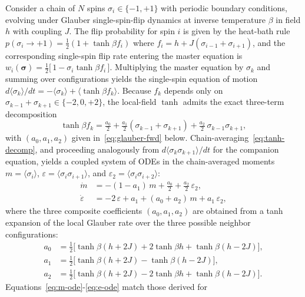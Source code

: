 \documentclass[conference]{IEEEtran}
\newcommand{\eps}{\varepsilon}
\newcommand{\epstwo}{\varepsilon_2}
\begin{document}
Consider a chain of $N$ spins $\sigma_i \in \{-1, +1\}$ with periodic
boundary conditions, evolving under Glauber single-spin-flip dynamics at
inverse temperature $\beta$ in field $h$ with coupling $J$. The flip
probability for spin $i$ is given by the heat-bath rule
$p(\sigma_i \to +1) = \tfrac{1}{2}(1 + \tanh \beta f_i)$ where
$f_i = h + J(\sigma_{i-1} + \sigma_{i+1})$, and the corresponding
single-spin flip rate entering the master equation is
$w_i(\boldsymbol\sigma) = \tfrac{1}{2}\bigl[\,1 - \sigma_i \tanh\beta f_i\,\bigr]$.
Multiplying the master equation by $\sigma_k$ and summing over
configurations yields the single-spin equation of motion
$d\langle\sigma_k\rangle/dt
   = -\langle\sigma_k\rangle + \langle\tanh\beta f_k\rangle$.
Because $f_k$ depends only on
$\sigma_{k-1}\!+\!\sigma_{k+1} \in \{-2, 0, +2\}$, the local-field
$\tanh$ admits the exact three-term decomposition
\begin{equation}
  \tanh\beta f_k
    = \tfrac{a_0}{2}
      + \tfrac{a_1}{2}(\sigma_{k-1}\!+\!\sigma_{k+1})
      + \tfrac{a_2}{2}\,\sigma_{k-1}\sigma_{k+1},
  \label{eq:tanh-decomp}
\end{equation}
with $(a_0, a_1, a_2)$ given in~\eqref{eq:glauber-fwd} below.
Chain-averaging~\eqref{eq:tanh-decomp}, and proceeding analogously
from $d\langle\sigma_k\sigma_{k+1}\rangle/dt$ for the companion
equation, yields a coupled system of ODEs in the chain-averaged
moments
$m \!=\! \langle \sigma_i \rangle$,
$\eps \!=\! \langle \sigma_i \sigma_{i+1} \rangle$, and
$\epstwo \!=\! \langle \sigma_i \sigma_{i+2} \rangle$:
\begin{align}
  \dot m &= -(1 - a_1)\,m + \tfrac{a_0}{2} + \tfrac{a_2}{2}\,\epstwo, \label{eq:m-ode}\\
  \dot \eps &= -2\,\eps + a_1 + (a_0 + a_2)\,m + a_1\,\epstwo,         \label{eq:e-ode}
\end{align}
where the three composite coefficients $(a_0, a_1, a_2)$ are obtained from
a tanh expansion of the local Glauber rate over the three possible
neighbor configurations:
\begin{align}
  a_0 &= \tfrac{1}{2}\bigl[\tanh\beta(h+2J) + 2\tanh\beta h + \tanh\beta(h-2J)\bigr], \nonumber \\
  a_1 &= \tfrac{1}{2}\bigl[\tanh\beta(h+2J) - \tanh\beta(h-2J)\bigr], \label{eq:glauber-fwd}\\
  a_2 &= \tfrac{1}{2}\bigl[\tanh\beta(h+2J) - 2\tanh\beta h + \tanh\beta(h-2J)\bigr]. \nonumber
\end{align}
Equations~\eqref{eq:m-ode}-\eqref{eq:e-ode} match those derived for
\end{document}
